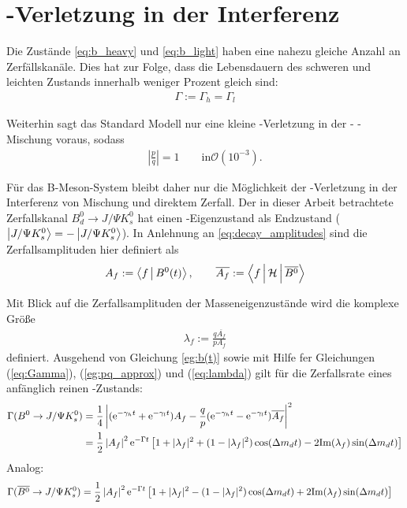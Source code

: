 \section{\CP-Verletzung in der Interferenz}
Die Zustände \ref{eq:b_heavy} und \ref{eq:b_light} haben eine nahezu gleiche Anzahl an Zerfällskanäle. Dies hat zur Folge, dass die Lebensdauern des schweren und leichten Zustands innerhalb weniger Prozent gleich sind:
\begin{align}
\Gamma := \Gamma_h = \Gamma_l \label{eq:Gamma}
\end{align}

Weiterhin sagt das Standard Modell nur eine kleine \CP-Verletzung in der \Bd - \Bdbar - Mischung voraus, sodass
\begin{align}
\left|\frac{p}{q}\right| = 1 \qquad \text{in} \mathcal{O}(10^{-3}). \label{eg:pq_approx}
\end{align}

Für das B-Meson-System bleibt daher nur die Möglichkeit der \CP-Verletzung in der Interferenz von Mischung und direktem Zerfall. Der in dieser Arbeit betrachtete Zerfallskanal $B_d^0 \rightarrow J/\Psi K_s^0$ hat einen \CP-Eigenzustand als Endzustand (\CP $\Ket{J/\Psi K_s^0} = -\Ket{J/\Psi K_s^0}$). In Anlehnung an \ref{eq:decay_amplitudes} sind die Zerfallsamplituden hier definiert als
\begin{align}
\nonumber A_f := \Braket{f|B^0(t)}, \qquad \overline{A_{f}} := \Braket{f|\mathcal{H}|\overline{B^0}}
\end{align}

Mit Blick auf die Zerfallsamplituden der Masseneigenzustände wird die komplexe Größe
\begin{align}
\lambda_f := \frac{q\overline{A_f}}{pA_f} \label{eq:lambda}
\end{align}
definiert. Ausgehend von Gleichung \ref{eg:b(t)} sowie mit Hilfe fer Gleichungen (\ref{eq:Gamma}), (\ref{eg:pq_approx}) und (\ref{eq:lambda}) gilt für die Zerfallsrate eines anfänglich reinen \Bd-Zustands:
\begin{align}
\nonumber \Gamma (B^0 \rightarrow J/\Psi K_s^0) &= \frac{1}{4}\left| (\mathrm{e}^{-\gamma_h t}+\mathrm{e}^{-\gamma_l t})A_f - \frac{q}{p}(\mathrm{e}^{-\gamma_h t}-\mathrm{e}^{-\gamma_l t})\overline{A_f}\right|^2 \\
&= \frac{1}{2} \left|A_f\right|^2\mathrm{e}^{-\Gamma t} \left[1+|\lambda_f|^2 + (1-|\lambda_f|^2)\cos(\Delta m_d t) - 2\mathrm{Im}(\lambda_f)\sin(\Delta m_d t)\right] \label{eq:bd}
\end{align}
Analog:
\begin{align}
\Gamma (\overline{B^0} \rightarrow J/\Psi K_s^0) &= \frac{1}{2} \left|A_f\right|^2\mathrm{e}^{-\Gamma t} \left[1+|\lambda_f|^2 -(1-|\lambda_f|^2)\cos(\Delta m_d t) + 2\mathrm{Im}(\lambda_f)\sin(\Delta m_d t)\right] \label{eq:bdbar}
\end{align}

